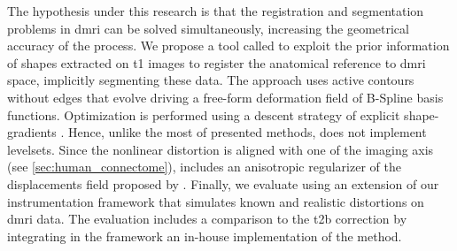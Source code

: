 The hypothesis under this research is that the registration and segmentation
  problems in \gls*{dmri} can be solved simultaneously, increasing the geometrical
  accuracy of the process.
We propose a tool called \regseg{} to exploit the prior information of shapes
  extracted on \gls*{t1} images to register the anatomical reference
  to \gls*{dmri} space, implicitly segmenting these data.
The approach uses active contours without edges \citep{chan_active_2001} that evolve driving a
  free-form deformation field of B-Spline basis functions.
Optimization is performed using a descent strategy of explicit shape-gradients
  \citep{besson_dream2s_2003,herbulot_segmentation_2006}.
Hence, unlike the most of presented methods, \regseg{} does not implement levelsets.
Since the nonlinear distortion is aligned with one of the imaging axis (see 
  \autoref{sec:human_connectome}), \regseg{} includes an anisotropic regularizer of
  the displacements field proposed by \cite{nagel_investigation_1986}.
Finally, we evaluate \regseg{} using an extension of our instrumentation framework
  \citep{esteban_simulationbased_2014} that simulates known and realistic distortions
  on \gls*{dmri} data.
The evaluation includes a comparison to the \gls*{t2b} correction by integrating in the framework
  an in-house implementation of the method.
